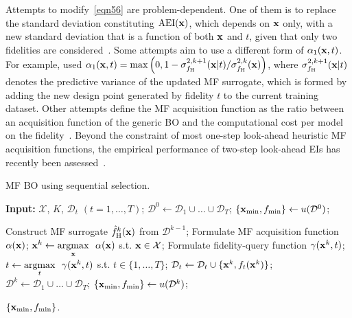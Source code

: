 \documentclass[iicol,sn-basic]{sn-jnl}%
\begin{document}
Attempts to modify~\cref{eqn56} are problem-dependent.
One of them is to replace the standard deviation constituting $\text{AEI}({\bf x})$, which depends on ${\bf x}$ only, with a new standard deviation that is a function of both ${\bf x}$ and $t$, given that only two fidelities are considered~\citep{ZhangY2018,Ruan2020}.
Some attempts aim to use a different form of $\alpha_1({\bf x},t)$.
For example, \cite{Sacher2021} used $\alpha_1({\bf x},t) = \max\left(0,1-\sigma_{f_\text{H}}^{2,k+1}({\bf x}|t)/\sigma_{f_\text{H}}^{2,k}({\bf x})\right)$, where $\sigma_{f_\text{H}}^{2,k+1}({\bf x}|t)$ denotes the predictive variance of the updated MF surrogate, which is formed by adding the new design point generated by fidelity $t$ to the current training dataset.  
Other attempts define the MF acquisition function as the ratio between an acquisition function of the generic BO and the computational cost per model on the fidelity~\citep{Winter2023,Foumani2023}.
Beyond the constraint of most one-step look-ahead heuristic MF acquisition functions, the empirical performance of two-step look-ahead EIs has recently been assessed~\citep{Ghoreishi2019,Fiore2023}.

\begin{algorithm}
	\caption{MF BO using sequential selection.}\label{Algo5}
	\begin{algorithmic}[1]
		\State \textbf{Input:} $\mathcal{X}$, $K$, $\mathcal{D}_t$ $(t=1,\dots,T)$;
		\State $\mathcal{D}^0 \gets \mathcal{D}_1 \cup \dots \cup \mathcal{D}_T$;
		\State $\{{\bf x}_{\min},f_{\min}\} \gets u(\mathcal{D}^0)$;
		
		\State Construct MF surrogate $\hat{f}_\text{H}^k({\bf x})$ from $\mathcal{D}^{k-1}$;
		\State Formulate MF acquisition function $\alpha({\bf x})$;
		\State ${\bf x}^{k} \gets \underset{{\bf x}}{\mathrm{argmax}} \ \ \alpha({\bf x})$ s.t. ${\bf x} \in \mathcal{X}$; \label{Algo5:7}
		\State Formulate fidelity-query function $\gamma({\bf x}^{k},t)$; \label{Algo5:8}
		\State $t \gets \underset{t}{\mathrm{argmax}} \ \ \gamma({\bf x}^{k},t)$ s.t. $t \in \{1,\dots,T\}$; \label{Algo5:9}
		\State $\mathcal{D}_t \gets \mathcal{D}_t \cup \{{\bf x}^{k},f_t({\bf x}^{k})\}$; \label{Algo5:10}
		\State $\mathcal{D}^k \gets \mathcal{D}_1 \cup \dots \cup \mathcal{D}_T$;
		\State $\{{\bf x}_{\min},f_{\min}\} \gets u(\mathcal{D}^k)$;
		\EndFor
		
		\State \Return $\{{\bf x}_{\min},f_{\min}\}$.
	\end{algorithmic}
\end{algorithm}
\end{document}
